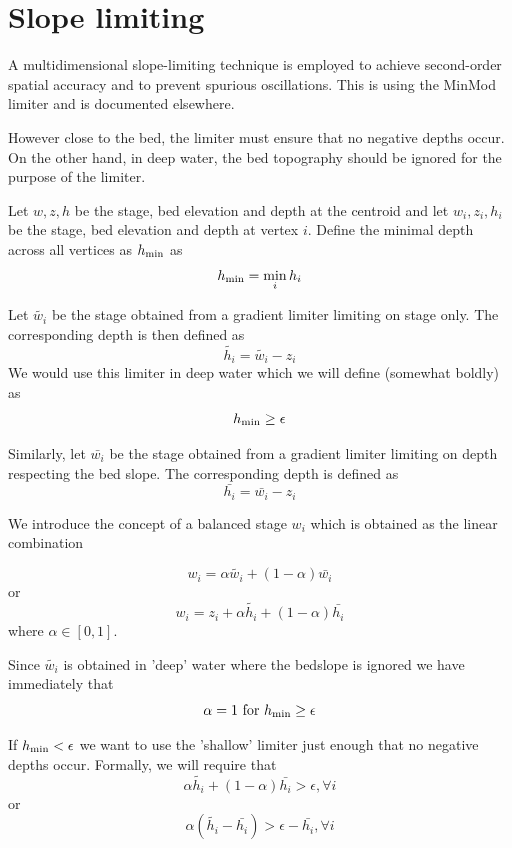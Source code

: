 \documentclass{manual}
\begin{document}


\section{Slope limiting}
A multidimensional slope-limiting technique is employed to achieve second-order spatial
accuracy and to prevent spurious oscillations. This is using the MinMod limiter and is
documented elsewhere.

However close to the bed, the limiter must ensure that no negative depths occur.
 On the other hand, in deep water, the bed topography should be ignored for the
purpose of the limiter.

Let $w, z, h$  be the stage, bed elevation and depth at the centroid and
let $w_i, z_i, h_i$ be the stage, bed elevation and depth at vertex $i$.
Define the minimal depth across all vertices as $h_{\min}$ as
\[
  h_{\min} = \min_i h_i
\]

Let $\tilde{w_i}$ be the stage obtained from a gradient limiter
limiting on stage only. The corresponding depth is then defined as
\[
  \tilde{h_i} = \tilde{w_i} - z_i
\]
We would use this limiter in deep water which we will define (somewhat boldly)
as
\[
  h_{\min} \ge \epsilon
\]

Similarly, let $\bar{w_i}$ be the stage obtained from a gradient
limiter limiting on depth respecting the bed slope.
The corresponding depth is defined as
\[
  \bar{h_i} = \bar{w_i} - z_i
\]

We introduce the concept of a balanced stage $w_i$ which is obtained as
the linear combination

\[
  w_i = \alpha \tilde{w_i} + (1-\alpha) \bar{w_i}
\]
or
\[
  w_i = z_i + \alpha \tilde{h_i} + (1-\alpha) \bar{h_i}
\]
where $\alpha \in [0, 1]$.

Since $\tilde{w_i}$ is obtained in 'deep' water where the bedslope
is ignored we have immediately that
\[
  \alpha = 1 \mbox{ for } \hmin \ge \epsilon %
\]

If $h_{\min} < \epsilon$ we want to use the 'shallow' limiter just enough that
no negative depths occur. Formally, we will require that
\[
  \alpha \tilde{h_i} + (1-\alpha) \bar{h_i} > \epsilon, \forall i
\]
or
\begin{equation}
  \alpha(\tilde{h_i} - \bar{h_i}) > \epsilon - \bar{h_i}, \forall i
  \label{eq:limiter bound}
\end{equation}
\end{document}
